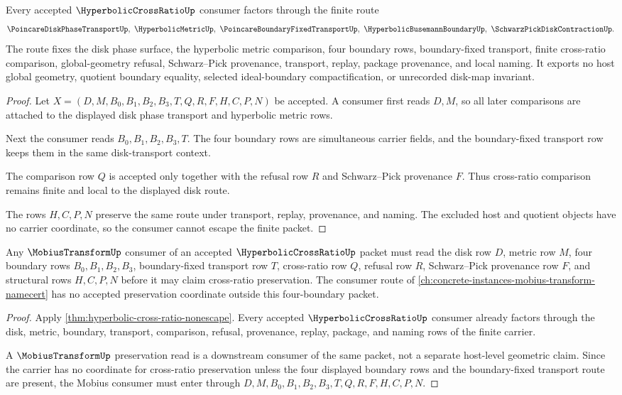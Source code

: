 \begin{theorem}
\label{thm:hyperbolic-cross-ratio-nonescape}
Every accepted $\HyperbolicCrossRatioUp$ consumer factors through the finite route
$$
\PoincareDiskPhaseTransportUp,\ \HyperbolicMetricUp,\ \PoincareBoundaryFixedTransportUp,\ \HyperbolicBusemannBoundaryUp,\ \SchwarzPickDiskContractionUp .
$$
The route fixes the disk phase surface, the hyperbolic metric comparison, four boundary rows, boundary-fixed transport, finite cross-ratio comparison, global-geometry refusal, Schwarz--Pick provenance, transport, replay, package provenance, and local naming. It exports no host global geometry, quotient boundary equality, selected ideal-boundary compactification, or unrecorded disk-map invariant.
\end{theorem}
\begin{proof}
Let $X=(D,M,B_0,B_1,B_2,B_3,T,Q,R,F,H,C,P,N)$ be accepted. A consumer first reads $D,M$, so all later comparisons are attached to the displayed disk phase transport and hyperbolic metric rows.

Next the consumer reads $B_0,B_1,B_2,B_3,T$. The four boundary rows are simultaneous carrier fields, and the boundary-fixed transport row keeps them in the same disk-transport context.

The comparison row $Q$ is accepted only together with the refusal row $R$ and Schwarz--Pick provenance $F$. Thus cross-ratio comparison remains finite and local to the displayed disk route.

The rows $H,C,P,N$ preserve the same route under transport, replay, provenance, and naming. The excluded host and quotient objects have no carrier coordinate, so the consumer cannot escape the finite packet.
\end{proof}

\begin{theorem}
\label{thm:hyperbolic-cross-ratio-mobius-consumer-route}
Any $\MobiusTransformUp$ consumer of an accepted $\HyperbolicCrossRatioUp$ packet must read the disk row $D$, metric row $M$, four boundary rows $B_0,B_1,B_2,B_3$, boundary-fixed transport row $T$, cross-ratio row $Q$, refusal row $R$, Schwarz--Pick provenance row $F$, and structural rows $H,C,P,N$ before it may claim cross-ratio preservation. The consumer route of \autoref{ch:concrete-instances-mobius-transform-namecert} has no accepted preservation coordinate outside this four-boundary packet.
\end{theorem}
\begin{proof}
Apply \autoref{thm:hyperbolic-cross-ratio-nonescape}. Every accepted $\HyperbolicCrossRatioUp$ consumer already factors through the disk, metric, boundary, transport, comparison, refusal, provenance, replay, package, and naming rows of the finite carrier.

A $\MobiusTransformUp$ preservation read is a downstream consumer of the same packet, not a separate host-level geometric claim. Since the carrier has no coordinate for cross-ratio preservation unless the four displayed boundary rows and the boundary-fixed transport route are present, the Mobius consumer must enter through $D,M,B_0,B_1,B_2,B_3,T,Q,R,F,H,C,P,N$.
\end{proof}

